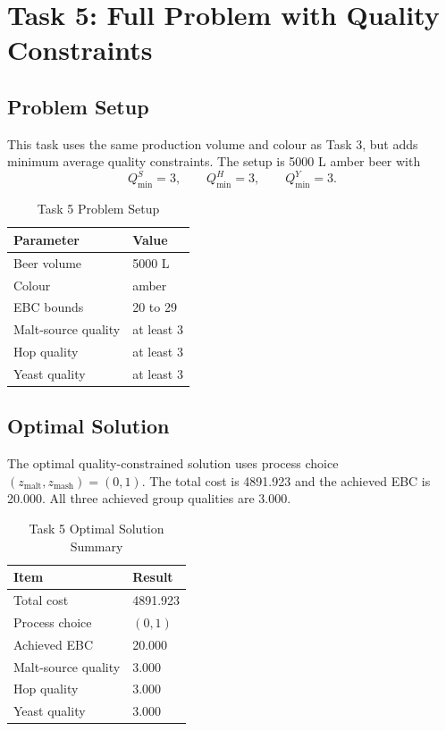 \section{Task 5: Full Problem with Quality Constraints}
\label{sec:task5}

\subsection{Problem Setup}
\label{sec:task5-setup}
This task uses the same production volume and colour as Task 3, but adds minimum average quality constraints. The setup is 5000 L amber beer with
\[
Q^S_{\min}=3,\qquad Q^H_{\min}=3,\qquad Q^Y_{\min}=3.
\]

\begin{table}[H]
\renewcommand{\arraystretch}{1.15}
\caption{Task 5 Problem Setup}
\label{tab:task35-setup}
\centering
\small
\begin{tabular}{@{}ll@{}}
\toprule
Parameter & Value \\
\midrule
Beer volume & 5000 L \\
Colour & amber \\
EBC bounds & 20 to 29 \\
Malt-source quality & at least 3 \\
Hop quality & at least 3 \\
Yeast quality & at least 3 \\
\bottomrule
\end{tabular}
\end{table}

\subsection{Optimal Solution}
\label{sec:task5-solution}
The optimal quality-constrained solution uses process choice $(z_{\mathrm{malt}},z_{\mathrm{mash}})=(0,1)$. The total cost is 4891.923 and the achieved EBC is 20.000. All three achieved group qualities are 3.000.

\begin{table}[H]
\renewcommand{\arraystretch}{1.15}
\caption{Task 5 Optimal Solution Summary}
\label{tab:task35-solution}
\centering
\small
\begin{tabular}{@{}ll@{}}
\toprule
Item & Result \\
\midrule
Total cost & 4891.923 \\
Process choice & $(0,1)$ \\
Achieved EBC & 20.000 \\
Malt-source quality & 3.000 \\
Hop quality & 3.000 \\
Yeast quality & 3.000 \\
\bottomrule
\end{tabular}
\end{table}

